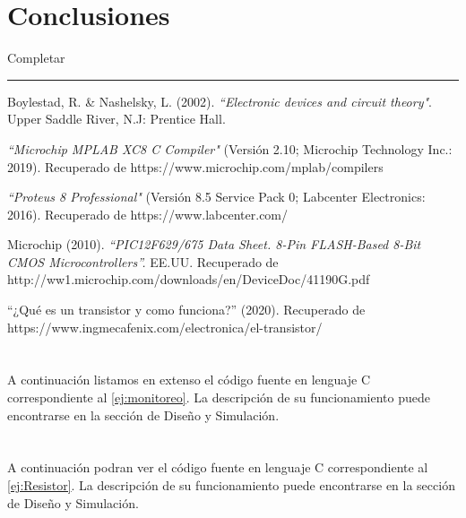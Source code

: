 \documentclass[a4paper]{article}
\let\originalappendix\appendix
\renewcommand{\appendix}{%
    \newpage\originalappendix\pagenumbering{gobble}%
    \renewcommand\thesection{Anexo \Alph{section}}
    \setcounter{secnumdepth}{1}
}
\begin{document}
\section{Conclusiones}

Completar

\noindent\rule{\textwidth}{1pt}

\begin{thebibliography}{9}

Boylestad, R. \& Nashelsky, L. (2002). 
\textit{``Electronic devices and circuit theory"}.
Upper Saddle River, N.J: Prentice Hall.

\textit{``Microchip MPLAB XC8 C Compiler"}
(Versión 2.10; Microchip Technology Inc.: 2019).
Recuperado de https://www.microchip.com/mplab/compilers

\textit{``Proteus 8 Professional"} 
(Versión 8.5 Service Pack 0; Labcenter Electronics: 2016).
Recuperado de https://www.labcenter.com/

Microchip (2010).
\textit{``PIC12F629/675 Data Sheet. 8-Pin FLASH-Based 8-Bit CMOS 
Microcontrollers''.}
EE.UU. Recuperado de 
http://ww1.microchip.com/downloads/en/DeviceDoc/41190G.pdf

``¿Qué es un transistor y como funciona?'' (2020).
Recuperado de 
https://www.ingmecafenix.com/electronica/el-transistor/

\end{thebibliography}


\appendix

\section{}\label{ane:monitoreo}
A continuación listamos en extenso el código fuente en lenguaje C
correspondiente al \ref{ej:monitoreo}. La descripción de su 
funcionamiento puede encontrarse en la sección de Diseño y 
Simulación.

%

\newpage
\section{}\label{ane:Corriente alterna o considerable}
A continuación podran ver el  código fuente en lenguaje C correspondiente
al \ref{ej:Resistor}. La descripción de su funcionamiento puede encontrarse en
la sección de Diseño y Simulación.

%
\end{document}
